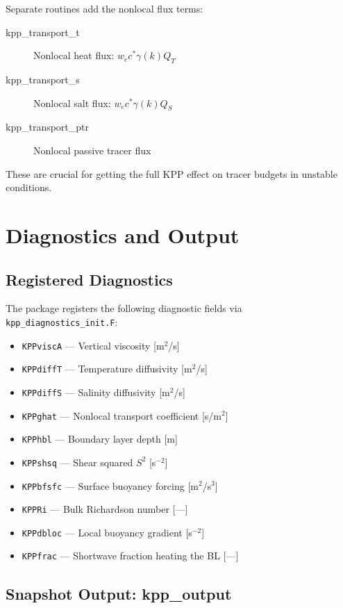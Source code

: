 \documentclass[11pt, a4paper]{article}
\begin{document}
Separate routines add the nonlocal flux terms:

\begin{description}
    \item[kpp\_transport\_t] Nonlocal heat flux: $w_e c^* \gamma(k) Q_T$
    \item[kpp\_transport\_s] Nonlocal salt flux: $w_e c^* \gamma(k) Q_S$
    \item[kpp\_transport\_ptr] Nonlocal passive tracer flux
\end{description}

These are crucial for getting the full KPP effect on tracer budgets in unstable conditions.

\section{Diagnostics and Output}

\subsection{Registered Diagnostics}

The package registers the following diagnostic fields via \texttt{kpp\_diagnostics\_init.F}:

\begin{itemize}
    \item \texttt{KPPviscA} — Vertical viscosity [m$^2$/s]
    \item \texttt{KPPdiffT} — Temperature diffusivity [m$^2$/s]
    \item \texttt{KPPdiffS} — Salinity diffusivity [m$^2$/s]
    \item \texttt{KPPghat} — Nonlocal transport coefficient [s/m$^2$]
    \item \texttt{KPPhbl} — Boundary layer depth [m]
    \item \texttt{KPPshsq} — Shear squared $S^2$ [s$^{-2}$]
    \item \texttt{KPPbfsfc} — Surface buoyancy forcing [m$^2$/s$^3$]
    \item \texttt{KPPRi} — Bulk Richardson number [—]
    \item \texttt{KPPdbloc} — Local buoyancy gradient [s$^{-2}$]
    \item \texttt{KPPfrac} — Shortwave fraction heating the BL [—]
\end{itemize}

\subsection{Snapshot Output: kpp\_output}
\end{document}
